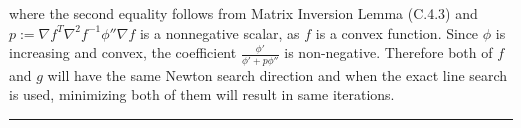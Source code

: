 \documentclass[12pt, letterpaper, twoside]{article}
\begin{document}
\begin{enumerate}
    where the second equality follows from Matrix Inversion Lemma (C.4.3) and $p:=\nabla f^T\nabla^2 f^{-1}\phi''\nabla f$ is a nonnegative scalar, as $f$ is a convex function. Since $\phi$ is increasing and convex, the coefficient $\frac{\phi'}{\phi'+p\phi''}$ is non-negative. Therefore both of $f$ and $g$ will have the same Newton search direction and when the exact line search is used, minimizing both of them will result in same iterations.
\end{enumerate}
\hrule




\end{document}
